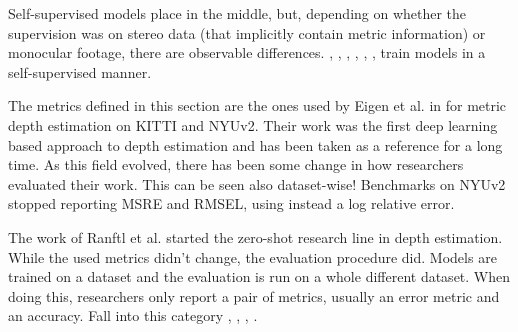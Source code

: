 Self-supervised models place in the middle, but, depending on whether the supervision was on stereo data (that implicitly contain metric information) or monocular footage, there are observable differences.
\cite{Garg}, \cite{MonoDepth}, \cite{MonoDepth2}, \cite{struct2depth}, \cite{vid2depth}, \cite{FeatDepth}, \cite{SfMLearner} train models in a self-supervised manner.

\vspace{0.5cm}

The metrics defined in this section are the ones used by Eigen et al. in \cite{Eigen} for metric depth estimation on KITTI and NYUv2.
Their work was the first deep learning based approach to depth estimation and has been taken as a reference for a long time.
As this field evolved, there has been some change in how researchers evaluated their work.
This can be seen also dataset-wise!
Benchmarks on NYUv2 stopped reporting MSRE and RMSEL, using instead a log relative error.

The work of Ranftl et al. \cite{MiDas} started the zero-shot research line in depth estimation.
While the used metrics didn't change, the evaluation procedure did.
Models are trained on a dataset and the evaluation is run on a whole different dataset.
When doing this, researchers only report a pair of metrics, usually an error metric and an accuracy.
Fall into this category \cite{MiDas}, \cite{PatchFusion}, \cite{Marigold}, \cite{ZoeDepth}.